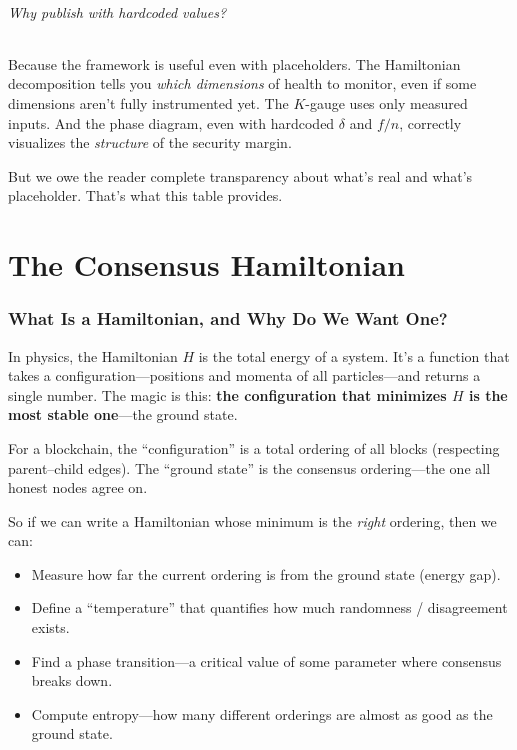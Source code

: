 \documentclass[11pt,a4paper]{article}
\begin{document}
\paragraph{Why publish with hardcoded values?} Because the framework is useful even with placeholders. The Hamiltonian decomposition tells you \emph{which dimensions} of health to monitor, even if some dimensions aren't fully instrumented yet. The $K$-gauge uses only measured inputs. And the phase diagram, even with hardcoded $\delta$ and $f/n$, correctly visualizes the \emph{structure} of the security margin.

But we owe the reader complete transparency about what's real and what's placeholder. That's what this table provides.

\part{The Consensus Hamiltonian}

\section{What Is a Hamiltonian, and Why Do We Want One?}

In physics, the Hamiltonian $H$ is the total energy of a system. It's a function that takes a configuration---positions and momenta of all particles---and returns a single number. The magic is this: \textbf{the configuration that minimizes $H$ is the most stable one}---the ground state.

For a blockchain, the ``configuration'' is a total ordering of all blocks (respecting parent--child edges). The ``ground state'' is the consensus ordering---the one all honest nodes agree on.

So if we can write a Hamiltonian whose minimum is the \emph{right} ordering, then we can:

\begin{itemize}
    \item Measure how far the current ordering is from the ground state (energy gap).
    \item Define a ``temperature'' that quantifies how much randomness / disagreement exists.
    \item Find a phase transition---a critical value of some parameter where consensus breaks down.
    \item Compute entropy---how many different orderings are almost as good as the ground state.
\end{itemize}
\end{document}
